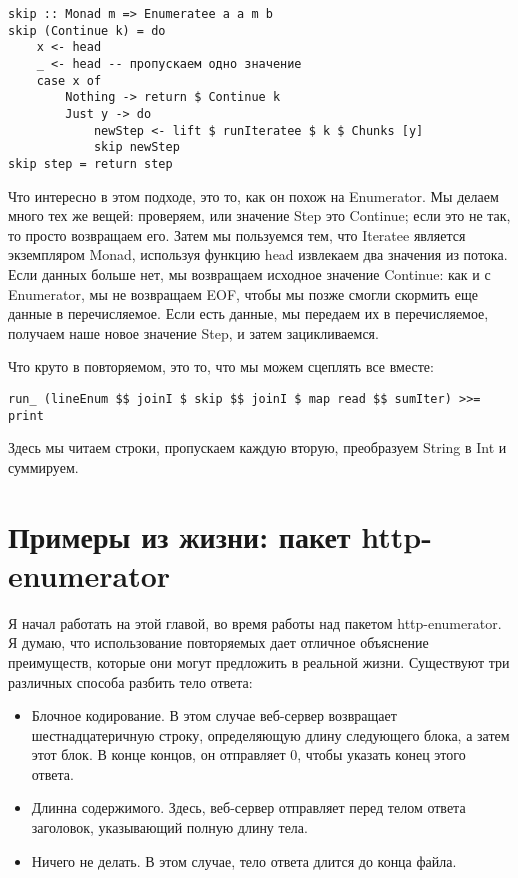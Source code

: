 \begin{lstlisting}
skip :: Monad m => Enumeratee a a m b
skip (Continue k) = do
    x <- head
    _ <- head -- пропускаем одно значение
    case x of
        Nothing -> return $ Continue k
        Just y -> do
            newStep <- lift $ runIteratee $ k $ Chunks [y]
            skip newStep
skip step = return step
\end{lstlisting}%

Что интересно в этом подходе, это то, как он похож на Enumerator. Мы делаем много тех же вещей: проверяем, или значение Step это Continue; если это не так, то просто возвращаем его. Затем мы пользуемся тем, что Iteratee является экземпляром Monad, используя функцию head извлекаем два значения из потока. Если данных больше нет, мы возвращаем исходное значение Continue: как и с Enumerator, мы не возвращаем EOF, чтобы мы позже смогли скормить еще данные в перечисляемое. Если есть данные, мы передаем их в перечисляемое, получаем наше новое значение Step, и затем зацикливаемся.

Что круто в повторяемом, это то, что мы можем сцеплять все вместе:

\begin{lstlisting}
run_ (lineEnum $$ joinI $ skip $$ joinI $ map read $$ sumIter) >>= print
\end{lstlisting}%

Здесь мы читаем строки, пропускаем каждую вторую, преобразуем String в Int и суммируем.

\section{Примеры из жизни: пакет http-enumerator}

Я начал работать на этой главой, во время работы над пакетом http-enumerator. Я думаю, что использование повторяемых дает отличное объяснение преимуществ, которые они могут предложить в реальной жизни. Существуют три различных способа разбить тело ответа:

\begin{itemize}
\item Блочное кодирование. В этом случае веб-сервер возвращает шестнадцатеричную строку, определяющую длину следующего блока, а затем этот блок. В конце концов, он отправляет 0, чтобы указать конец этого ответа.
\item Длинна содержимого. Здесь, веб-сервер отправляет перед телом ответа заголовок, указывающий полную длину тела.
\item Ничего не делать. В этом случае, тело ответа длится до конца файла.
\end{itemize}

